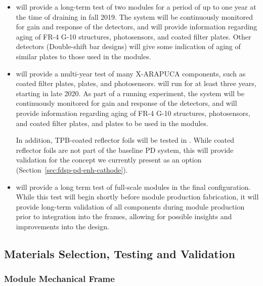 \begin{itemize}

    \item {} will provide a long-term test of two  modules for a period of up to one year at the time of draining in fall 2019.  The system will be continuously monitored for gain and response of the detectors, and will provide information regarding aging of FR-4 G-10 structures, photosensors, and coated filter plates.  Other  detectors (Double-shift bar designs) will give some indication of aging of similar  plates to those used in the  modules.
    \item {} will provide a multi-year test of many X-ARAPUCA components, such as coated filter plates,  plates, and photosensors.   will run for at least three years, starting in late 2020.  As part of a running experiment, the system will be continuously monitored for gain and response of the detectors, and will provide information regarding aging of FR-4 G-10 structures, photosensors, and coated filter plates, and  plates to be used in the  modules.
    
    In addition, TPB-coated reflector foils will be tested in . While coated reflector foils are not part of the baseline PD system, this will provide validation for the concept we currently present as an option (Section~\ref{sec:fdsp-pd-enh-cathode}).
    
    \item {} will provide a long term test of full-scale  modules in the final  configuration. While this test will begin shortly before   module production fabrication, it will provide long-term validation of all  components during module production prior to integration into the  frames, allowing for possible insights and improvements into the  design.

\end{itemize}


\subsection{Materials Selection, Testing and Validation}

\subsubsection{ Module Mechanical Frame}

